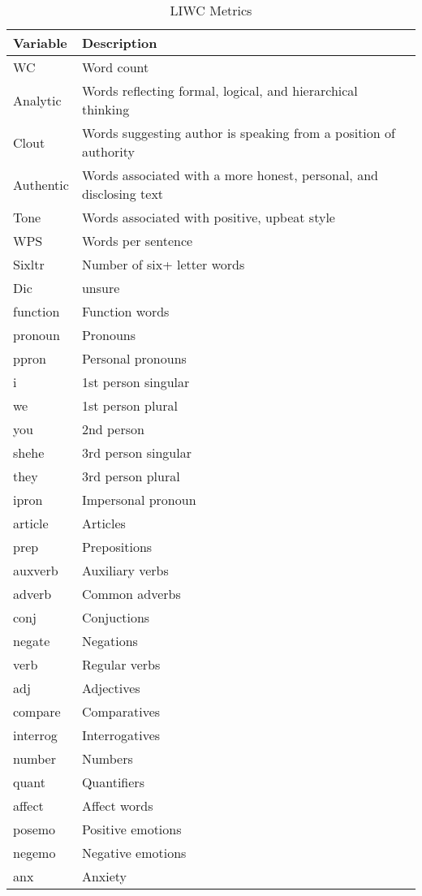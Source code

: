 \documentclass[../thesis.tex]{subfiles}
\begin{document}
\begin{longtable}[t]{ll}
\caption{\label{tab:}LIWC Metrics}\\
\toprule
Variable & Description\\
\midrule
WC & Word count\\
Analytic & Words reflecting formal, logical, and hierarchical thinking\\
Clout & Words suggesting author is speaking from a position of authority\\
Authentic & Words associated with a more honest, personal, and disclosing text\\
Tone & Words associated with positive, upbeat style\\
\addlinespace
WPS & Words per sentence\\
Sixltr & Number of six+ letter words\\
Dic & unsure\\
function & Function words\\
pronoun & Pronouns\\
\addlinespace
ppron & Personal pronouns\\
i & 1st person singular\\
we & 1st person plural\\
you & 2nd person\\
shehe & 3rd person singular\\
\addlinespace
they & 3rd person plural\\
ipron & Impersonal pronoun\\
article & Articles\\
prep & Prepositions\\
auxverb & Auxiliary verbs\\
\addlinespace
adverb & Common adverbs\\
conj & Conjuctions\\
negate & Negations\\
verb & Regular verbs\\
adj & Adjectives\\
\addlinespace
compare & Comparatives\\
interrog & Interrogatives\\
number & Numbers\\
quant & Quantifiers\\
affect & Affect words\\
\addlinespace
posemo & Positive emotions\\
negemo & Negative emotions\\
anx & Anxiety\\

\end{longtable}
\end{document}
